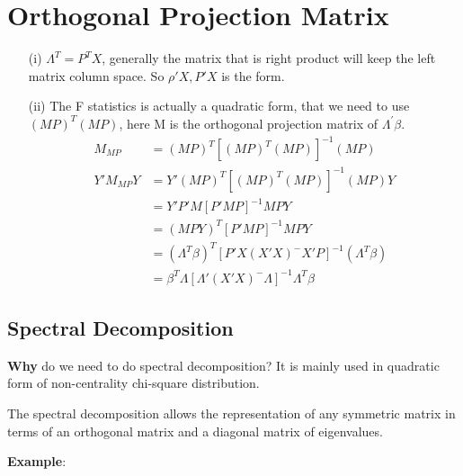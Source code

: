 
 \section{Orthogonal Projection Matrix}
 
\begin{itemize}

\item[(i)] $\Lambda^{T}  = P^T X$, generally the matrix that is right product will keep the left matrix column space. So $\rho' X, P' X$ is the form.

\item[(ii)] The F statistics is actually a quadratic form, that we need to use $(MP)^T(MP)$, here M is the orthogonal projection matrix of $\Lambda^{'} \beta$. 
\begin{align*}
	M_{MP}&= (MP)^{T} [(MP)^T (MP)]^{-1} (MP) \\
	Y' M_{MP} Y &= Y'  (MP)^{T} [(MP)^T (MP)]^{-1} (MP) Y \\
	&= Y'P' M [P'MP]^{-1} MPY \\
	&= (MPY)^{T} [P'MP]^{-1} MPY \\
	&= (\Lambda^T \beta)^T [P' X (X'X)^{-} X' P]^{-1} (\Lambda^T \beta) \\
	&= \beta^T \Lambda [\Lambda' (X'X)^{-} \Lambda]^{-1} \Lambda^T \beta
\end{align*} 

\end{itemize}


 \subsection{Spectral Decomposition}
 
 \textbf{Why} do we need to do spectral decomposition? It is mainly used in quadratic form of non-centrality chi-square distribution.
 
 \begin{definition}
 The spectral decomposition allows the representation of any symmetric matrix in terms of an orthogonal matrix and a diagonal matrix of eigenvalues.
 \end{definition}
 
\textbf{Example}:
 
 